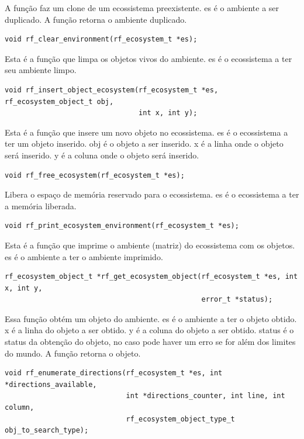 \documentclass[12pt]{article}
\begin{document}
A função faz um clone de um ecossistema preexistente.
es é o ambiente a ser duplicado.
A função retorna o ambiente duplicado.

\begin{verbatim}
void rf_clear_environment(rf_ecosystem_t *es);
      \end{verbatim}

Esta é a função que limpa os objetos vivos do ambiente.
es é o ecossistema a ter seu ambiente limpo.


\begin{verbatim}
void rf_insert_object_ecosystem(rf_ecosystem_t *es, rf_ecosystem_object_t obj,
                                int x, int y);
      \end{verbatim}

Esta é a função que insere um novo objeto no ecossistema.
es é o ecossistema a ter um objeto inserido.
obj é o objeto a ser inserido.
x é a linha onde o objeto será inserido.
y é a coluna onde o objeto será inserido.


\begin{verbatim}
void rf_free_ecosystem(rf_ecosystem_t *es);
      \end{verbatim}

Libera o espaço de memória reservado para o ecossistema.
es é o ecossistema a ter a memória liberada.

\begin{verbatim}
void rf_print_ecosystem_environment(rf_ecosystem_t *es);
      \end{verbatim}

Esta é a função que imprime o ambiente (matriz) do ecossistema com os objetos.
es é o ambiente a ter o ambiente imprimido.

\begin{verbatim}
rf_ecosystem_object_t *rf_get_ecosystem_object(rf_ecosystem_t *es, int x, int y,
                                               error_t *status);
      \end{verbatim}

Essa função obtém um objeto do ambiente.
es é o ambiente a ter o objeto obtido.
x é a linha do objeto a ser obtido.
y é a coluna do objeto a ser obtido.
status é o status da obtenção do objeto, no caso pode haver um erro se for além dos limites do mundo.
A função retorna o objeto.


\begin{verbatim}
void rf_enumerate_directions(rf_ecosystem_t *es, int *directions_available,
                             int *directions_counter, int line, int column,
                             rf_ecosystem_object_type_t obj_to_search_type);
      \end{verbatim}
\end{document}
